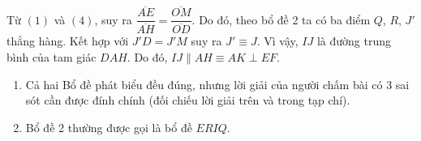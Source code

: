 \begin{bt}
{		Từ $(1)$ và $(4)$, suy ra $\dfrac{ \overline{AE} }{\overline{AH}}=\dfrac{\overline{OM}}{\overline{OD}}.$		
		Do đó, theo bổ đề 2 ta có ba điểm $Q$, $R$, $J'$ thẳng hàng. Kết hợp với $J'D=J'M$ suy ra $J'\equiv J$. Vì vậy, $IJ$ là đường trung bình của tam giác $DAH$. Do đó, $IJ\parallel AH\equiv AK\perp EF$.
		\begin{nx}\hfill
			\begin{enumerate}
				\item Cả hai Bổ đề phát biểu đều đúng, nhưng lời giải của người chấm bài có 3 sai sót cần được đính chính (đối chiếu lời giải trên và trong tạp chí).
				\item Bổ đề 2 thường được gọi là bổ đề $ERIQ$.
			\end{enumerate}
		\end{nx}
	}
\end{bt}

